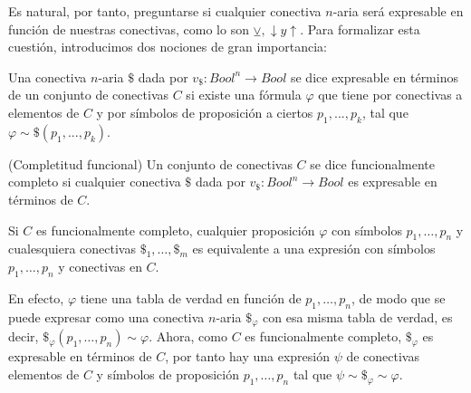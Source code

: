 \noindent Es natural, por tanto, preguntarse si cualquier conectiva $n$-aria será expresable en función de nuestras conectivas, como lo son $\veebar,\downarrow y\uparrow$. Para formalizar esta cuestión, introducimos dos nociones de gran importancia:

\begin{definition}
 Una conectiva $n$-aria $\$$ dada por $v_{\$}: Bool^{n} \rightarrow Bool$ se dice expresable en términos de un conjunto de conectivas $C$ si existe una fórmula $\varphi$ que tiene por conectivas a elementos de $C$ y por símbolos de proposición a ciertos $p_1, ..., p_k$, tal que $\varphi \sim \$(p_1, ..., p_k)$.
\end{definition}


\begin{definition}(Completitud funcional)
Un conjunto de conectivas $C$ se dice funcionalmente completo si cualquier conectiva $\$$ dada por $v_{\$}: Bool^{n} \rightarrow Bool$ es expresable en términos de $C$.
\end{definition}

\begin{example}
Si $C$ es funcionalmente completo, cualquier proposición $\varphi$ con símbolos $p_1,\dots,p_n$ y cualesquiera conectivas $\$_1,\dots,\$_m$ es equivalente a una expresión con símbolos $p_1,\dots,p_n$ y conectivas en $C$. 

En efecto, $\varphi$ tiene una tabla de verdad en función de $p_1,\dots,p_n$, de modo que se puede expresar como una conectiva $n$-aria $\$_\varphi$ con esa misma tabla de verdad, es decir, $\$_\varphi(p_1,\dots,p_n)\sim\varphi$. Ahora, como $C$ es funcionalmente completo, $\$_\varphi$ es  expresable en términos de $C$, por tanto hay una expresión $\psi$ de conectivas elementos de $C$ y símbolos de proposición $p_1,\dots,p_n$ tal que $\psi\sim\$_\varphi\sim\varphi$.
\end{example}



